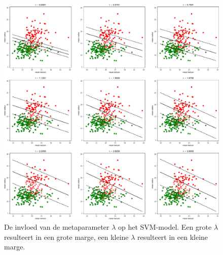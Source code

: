\documentclass[TeamE-eindrapport]{subfiles}
\begin{document}
	\begin{figure}
		\centering
		\includegraphics[width=.99\textwidth]{lambda}
		\caption{De invloed van de metaparameter \(\lambda\) op het SVM-model. Een grote \(\lambda\) resulteert in een grote marge, een kleine \(\lambda\) resulteert in een kleine marge.}
		\label{fig:lambda}
	\end{figure}
	
	\nocite{enwiki:1183475870}
	\nocite{mediumarticle}
	
	
\end{document}
